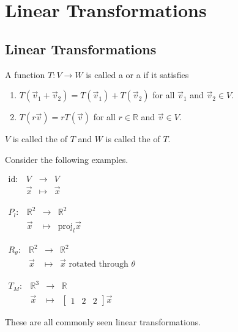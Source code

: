 \documentclass[11pt,fleqn]{book} %
\begin{document}
\chapter{Linear Transformations}

\section{Linear Transformations}

\begin{definition}
    A function $T: V \to W$ is called a  or a  if it satisfies

    \begin{enumerate}[label=\roman*)]
        \item $T(\vec{v}_1 + \vec{v}_2) = T(\vec{v}_1) + T(\vec{v}_2)$ for all $\vec{v}_1$ and $\vec{v}_2 \in V$.
        \item $T(r\vec{v}) = rT(\vec{v})$ for all $r \in \mathbb{R}$ and $\vec{v} \in V$.
    \end{enumerate}

    $V$ is called the  of $T$ and $W$ is called the  of $T$.
\end{definition}

\begin{example} Consider the following examples.

\begin{minipage}[t]{0.45\linewidth}
    $\begin{matrix} \mathrm{id}: &V &\to &V \\ &\vec{x} &\mapsto &\vec{x} \end{matrix}$

    $\begin{matrix} P_l: &\mathbb{R}^2 &\to &\mathbb{R}^2 \\ &\vec{x} &\mapsto &\mathrm{proj}_l\vec{x} \end{matrix}$
\end{minipage}
\begin{minipage}[t]{0.45\linewidth}
    $\begin{matrix} R_{\theta}: &\mathbb{R}^2 &\to &\mathbb{R}^2 \\ &\vec{x} &\mapsto &\vec{x}\text{ rotated through }\theta \end{matrix}$

    $\begin{matrix} T_M: &\mathbb{R}^3 &\to &\mathbb{R} \\ &\vec{x} &\mapsto &\begin{bmatrix} 1&2&2 \end{bmatrix}\vec{x} \end{matrix}$
\end{minipage}

These are all commonly seen linear transformations.
\end{example}
\end{document}
